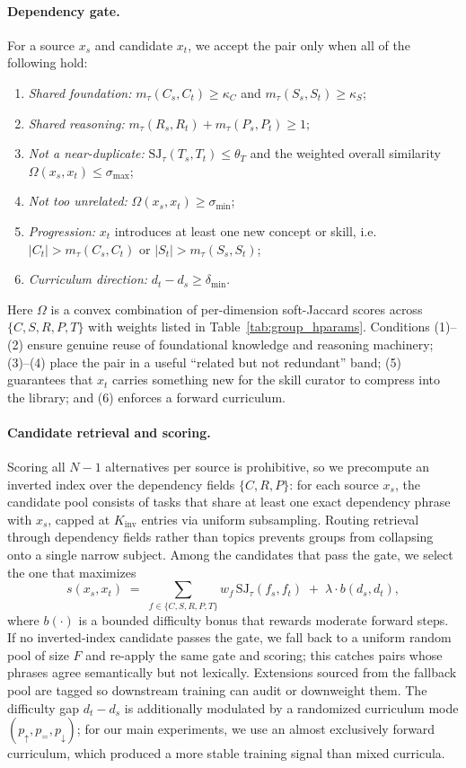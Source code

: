 \paragraph{Dependency gate.}
For a source $x_s$ and candidate $x_t$, we accept the pair only when all of the
following hold:
\begin{enumerate}[leftmargin=1.5em,itemsep=1pt,topsep=1pt]
\item \emph{Shared foundation:} $m_\tau(C_s,C_t)\ge\kappa_C$ and
      $m_\tau(S_s,S_t)\ge\kappa_S$;
\item \emph{Shared reasoning:} $m_\tau(R_s,R_t)+m_\tau(P_s,P_t)\ge 1$;
\item \emph{Not a near-duplicate:} $\mathrm{SJ}_\tau(T_s,T_t)\le\theta_T$ and the weighted
      overall similarity $\Omega(x_s,x_t)\le\sigma_{\max}$;
\item \emph{Not too unrelated:} $\Omega(x_s,x_t)\ge\sigma_{\min}$;
\item \emph{Progression:} $x_t$ introduces at least one new concept or skill,
      i.e.\ $|C_t|>m_\tau(C_s,C_t)$ or $|S_t|>m_\tau(S_s,S_t)$;
\item \emph{Curriculum direction:} $d_t-d_s\ge\delta_{\min}$.
\end{enumerate}
Here $\Omega$ is a convex combination of per-dimension soft-Jaccard scores across
$\{C,S,R,P,T\}$ with weights listed in Table~\ref{tab:group_hparams}. Conditions
(1)--(2) ensure genuine reuse of foundational knowledge and reasoning machinery; (3)--(4)
place the pair in a useful ``related but not redundant'' band; (5) guarantees that
$x_t$ carries something new for the skill curator to compress into the library; and
(6) enforces a forward curriculum.
 
\paragraph{Candidate retrieval and scoring.}
Scoring all $N{-}1$ alternatives per source is prohibitive, so we precompute an inverted index over the dependency fields $\{C,R,P\}$: for each source $x_s$, the candidate pool consists of tasks that share at least one exact dependency phrase with $x_s$, capped at $K_{\text{inv}}$ entries via uniform subsampling. Routing retrieval through dependency fields rather than topics prevents groups from collapsing onto a single narrow subject. Among the candidates that pass the gate, we select the one that maximizes
\[
s(x_s,x_t)\;=\;\sum_{f\in\{C,S,R,P,T\}} w_f\,\mathrm{SJ}_\tau(f_s,f_t)
\;+\;\lambda\cdot b(d_s,d_t),
\]
where $b(\cdot)$ is a bounded difficulty bonus that rewards moderate forward steps. If no inverted-index candidate passes the gate, we fall back to a uniform random pool of size $F$ and re-apply the same gate and scoring; this catches pairs whose phrases agree semantically but not lexically. Extensions sourced from the fallback pool are tagged so downstream training can audit or downweight them. The difficulty gap $d_t-d_s$ is additionally modulated by a randomized curriculum mode $(p_\uparrow,p_=,p_\downarrow)$; for our main experiments, we use an almost exclusively forward curriculum, which produced a more stable training signal than mixed curricula.
 
